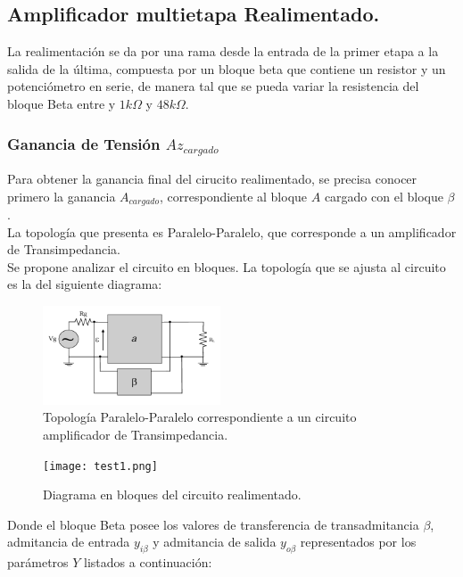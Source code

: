 \documentclass[letterpaper, 10 pt, conference]{ieeeconf}  %
\begin{document}
\subsection{\textbf{Amplificador multietapa Realimentado.}}

La realimentación se da por una rama desde la entrada de la primer etapa a la salida de la última, compuesta por un bloque beta que contiene un resistor y un potenciómetro en serie, de manera tal que se pueda variar la resistencia del bloque Beta entre y $1k\Omega$ y $48k\Omega$.\\

\subsubsection{Ganancia de Tensión $Az_{cargado}$}

Para obtener la ganancia final del cirucito realimentado, se precisa conocer primero la ganancia $A_{cargado}$, correspondiente al bloque $A$ cargado con el bloque $\beta$.\\
La topología que presenta es Paralelo-Paralelo, que corresponde a un amplificador de Transimpedancia.\\
Se propone analizar el circuito en bloques. La topología que se ajusta al circuito es la del siguiente diagrama:

\begin{figure}[H]
  \centering
  \includegraphics[width=0.47\textwidth]{imagenes/topologia.png}
  \caption{Topología Paralelo-Paralelo correspondiente a un circuito amplificador de Transimpedancia.}
  \label{fig:diagrama_bloques_realimentacion}
\end{figure}

\begin{figure}[H]
  \centering
  \texttt{[image: test1.png]}
  \caption{Diagrama en bloques del circuito realimentado.}
  \label{fig:diagrama_bloques_realimentacion}
\end{figure}

Donde el bloque Beta posee los valores de transferencia de transadmitancia $\beta$, admitancia de entrada $y_{i\beta}$ y admitancia de salida $y_{o\beta}$ representados por los parámetros $Y$ listados a continuación:
\end{document}
